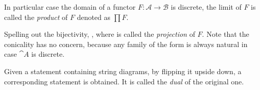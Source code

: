 \begin{definition}[Product]
In particular case the domain of a functor $F : \mathcal{A} \to \mathcal{B}$ is discrete, %
the limit of $F$ is called the \emph{product }of $F$ denoted as $\textstyle\prod F$. %
\end{definition}
Spelling out the bijectivity,
, where %
is called the \emph{projection} of $F$. 
\mynewline
Note that the conicality has no concern, because any family of the form
is always natural in case $\cat A$ is discrete.

\begin{definition}[Dual]
Given a statement containing string diagrams, by flipping it upside down, %
a corresponding statement is obtained. It is called the \emph{dual} of the original one.
\end{definition}

